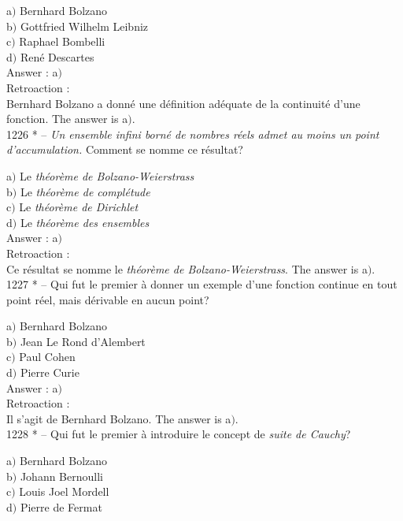 ﻿\documentclass[letterpaper, 12pt]{article}
\begin{document}
a$)$ Bernhard Bolzano \\
b$)$ Gottfried Wilhelm Leibniz \\
c$)$ Raphael Bombelli \\
d$)$ Ren\'e Descartes\\

Answer : a$)$\\

Retroaction : \\
Bernhard Bolzano a donn\'e une d\'efinition ad\'equate de la
continuit\'e d'une fonction.
The answer is a$)$.\\

1226 * -- {\sl Un ensemble infini born\'e de nombres r\'eels admet
au moins un point d'accumulation.} Comment se nomme ce r\'esultat?

a$)$ Le {\sl th\'eor\`eme de Bolzano-Weierstrass} \\
b$)$ Le {\sl th\'eor\`eme de compl\'etude} \\
c$)$ Le {\sl th\'eor\`eme de Dirichlet} \\
d$)$ Le {\sl th\'eor\`eme des ensembles}\\

Answer : a$)$\\

Retroaction : \\
Ce r\'esultat se nomme le {\sl th\'eor\`eme de Bolzano-Weierstrass}.
The answer is a$)$.\\

1227 * -- Qui fut le premier \`a donner un exemple d'une fonction
continue en tout point r\'eel, mais d\'erivable en aucun point?

a$)$ Bernhard Bolzano \\
b$)$ Jean Le Rond d'Alembert \\
c$)$ Paul Cohen \\
d$)$ Pierre Curie\\

Answer : a$)$\\

Retroaction : \\
Il s'agit de Bernhard Bolzano.
The answer is a$)$.\\

1228 * -- Qui fut le premier \`a introduire le concept de {\sl suite
de Cauchy}?

a$)$ Bernhard Bolzano \\
b$)$ Johann Bernoulli \\
c$)$ Louis Joel Mordell \\
d$)$ Pierre de Fermat\\
\end{document}
